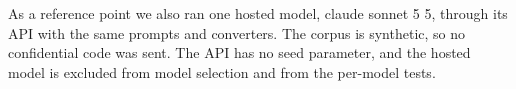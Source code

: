 As a reference point we also ran one hosted model, claude sonnet 5 5, through its API with the same prompts and converters. The corpus is synthetic, so no confidential code was sent. The API has no seed parameter, and the hosted model is excluded from model selection and from the per-model tests.
